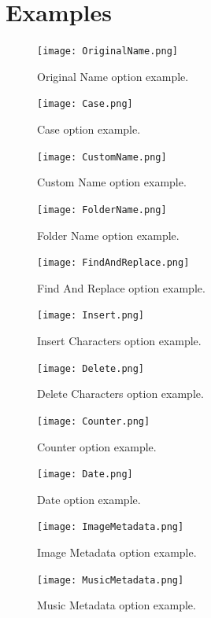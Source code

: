 \documentclass[11pt, a4paper]{scrartcl}
\begin{document}
\section{Examples}

\begin{figure}[!ht]
        \centering
        \texttt{[image: OriginalName.png]}
        \caption{Original Name option example.}
        \label{OriginalName}
\end{figure}
\begin{figure}[!ht]
        \centering
        \texttt{[image: Case.png]}
        \caption{Case option example.}
        \label{Case}
\end{figure}
\begin{figure}[!ht]
        \centering
        \texttt{[image: CustomName.png]}
        \caption{Custom Name option example.}
        \label{CustomName}
\end{figure}
\begin{figure}[!ht]
        \centering
        \texttt{[image: FolderName.png]}
        \caption{Folder Name option example.}
        \label{FolderName}
\end{figure}
\begin{figure}[!ht]
        \centering
        \texttt{[image: FindAndReplace.png]}
        \caption{Find And Replace option example.}
        \label{FindAndReplace}
\end{figure}
\begin{figure}[!ht]
        \centering
        \texttt{[image: Insert.png]}
        \caption{Insert Characters option example.}
        \label{Insert}
\end{figure}
\begin{figure}[!ht]
        \centering
        \texttt{[image: Delete.png]}
        \caption{Delete Characters option example.}
        \label{Delete}
\end{figure}
\begin{figure}[!ht]
        \centering
        \texttt{[image: Counter.png]}
        \caption{Counter option example.}
        \label{Counter}
\end{figure}
\begin{figure}[!ht]
        \centering
        \texttt{[image: Date.png]}
        \caption{Date option example.}
        \label{Date}
\end{figure}
\begin{figure}[!ht]
        \centering
        \texttt{[image: ImageMetadata.png]}
        \caption{Image Metadata option example.}
        \label{ImageMetadata}
\end{figure}
\begin{figure}[!ht]
        \centering
        \texttt{[image: MusicMetadata.png]}
        \caption{Music Metadata option example.}
        \label{MusicMetadata}
\end{figure}
\end{document}
